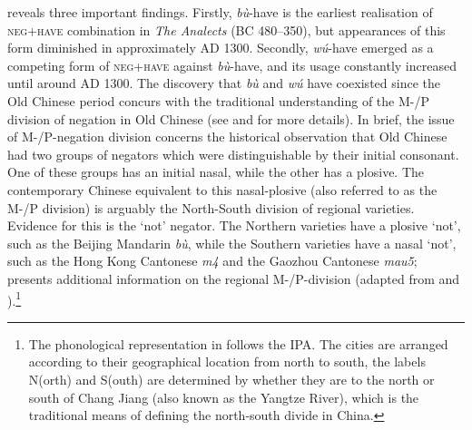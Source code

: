 \documentclass[output=paper]{langscibook}
\begin{document}
 reveals three important findings. Firstly, \textit{bù}-have is the earliest realisation of \textsc{neg}+\textsc{have} combination in \emph{The Analects} (BC 480–350), but appearances of this form diminished in approximately AD 1300. Secondly, \textit{wú}-have emerged as a competing form of \textsc{neg}+\textsc{have} against \textit{bù}-have, and its usage constantly increased until around AD 1300. The discovery that \textit{bù} and \textit{wú} have coexisted since the Old Chinese period concurs with the traditional understanding of the M-/P division of negation in Old Chinese (see \citealt{Hashimoto1985} and \citealt{Zhang2002} for more details). In brief, the issue of M-/P-negation division concerns the historical observation that Old Chinese had two groups of negators which were distinguishable by their initial consonant. One of these groups has an initial nasal, while the other has a plosive. The contemporary Chinese equivalent to this nasal-plosive (also referred to as the M-/P division) is arguably the North-South division of regional varieties. Evidence for this is the `not' negator. The Northern varieties have a plosive `not', such as the Beijing Mandarin \textit{bù}, while the Southern varieties have a nasal `not', such as the Hong Kong Cantonese \textit{m4} and the Gaozhou Cantonese \textit{mau5};  presents additional information on the regional M-/P-division (adapted from \citealt{Hashimoto1985} and \citealt{Zhang2002}).\footnote{The phonological representation in  follows the IPA. The cities are arranged according to their geographical location from north to south, the labels N(orth) and S(outh) are determined by whether they are to the north or south of Chang Jiang (also known as the Yangtze River), which is the traditional means of defining the north-south divide in China.}
\end{document}
